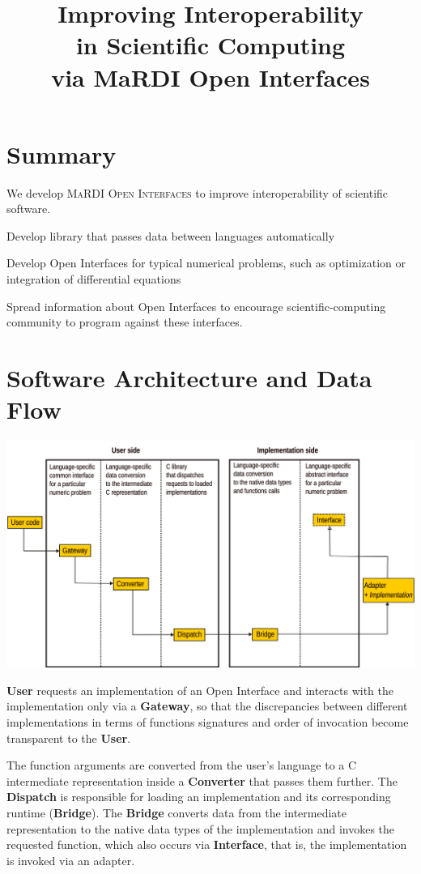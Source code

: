 \documentclass{mmposter}
\title{Improving Interoperability\\in Scientific Computing\\via MaRDI Open Interfaces}
\newcommand{\OIF}{\textsc{MaRDI Open Interfaces}\xspace}
\begin{document}


\maketitle

\section*{Summary}
We develop \OIF{} to improve interoperability of scientific software.

\begin{objectives}
  \item Develop library that passes data between languages automatically
  \item Develop Open Interfaces for typical numerical problems,
  such as optimization or integration of differential equations
  \item Spread information about Open Interfaces to encourage
  scientific-computing community to program against these interfaces.
\end{objectives}

\section*{Software Architecture and Data Flow}
\includegraphics[width=\columnwidth]{arch.png}

\textbf{User} requests an implementation of an Open Interface
and interacts with the implementation only via a \textbf{Gateway},
so that the discrepancies between different implementations in terms
of functions signatures and order of invocation become transparent
to the \textbf{User}.

The function arguments are converted from the user's language
to a C intermediate representation inside a \textbf{Converter}
that passes them further.
The \textbf{Dispatch} is responsible for loading an implementation
and its corresponding runtime (\textbf{Bridge}).
The \textbf{Bridge} converts data from the intermediate representation
to the native data types of the implementation and invokes
the requested function, which also occurs via \textbf{Interface},
that is, the implementation is invoked via an adapter.
\end{document}
